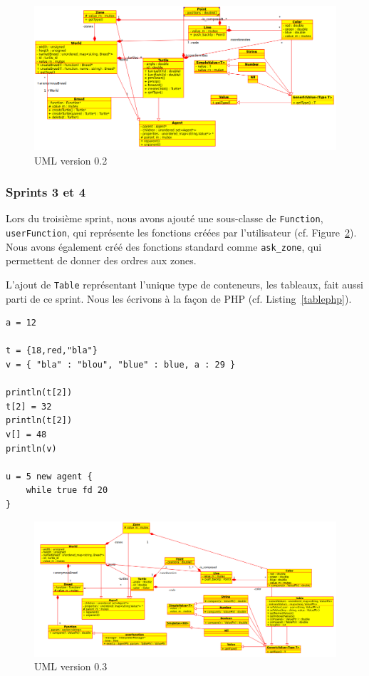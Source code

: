 \begin{figure}[h]
\centering
\includegraphics[scale=0.45]{doc/report/uml/v02.png}
\caption{\label{v0.2} UML version 0.2}
\end{figure}

\subsubsection{Sprints 3 et 4}
Lors du troisième sprint, nous avons ajouté une sous-classe de \verb|Function|, \verb|userFunction|, qui représente les fonctions créées par l'utilisateur (cf. Figure~\ref{v0.3}). Nous avons également créé des fonctions standard comme \verb|ask_zone|, qui permettent de donner des ordres aux zones.

L'ajout de \verb|Table| représentant l'unique type de conteneurs, les tableaux, fait aussi parti de ce sprint.
Nous les écrivons à la façon de PHP (cf. Listing~\ref{tablephp}).
\begin{lstlisting}[label=tablephp,caption=Syntaxe des tables en Stibbons]
a = 12

t = {18,red,"bla"}
v = { "bla" : "blou", "blue" : blue, a : 29 }

println(t[2])
t[2] = 32
println(t[2])
v[] = 48
println(v)

u = 5 new agent {
	while true fd 20
}
\end{lstlisting}

\begin{figure}[h]
\centering
\includegraphics[scale=0.4]{doc/report/uml/v03.png}
\caption{\label{v0.3} UML version 0.3}
\end{figure}

